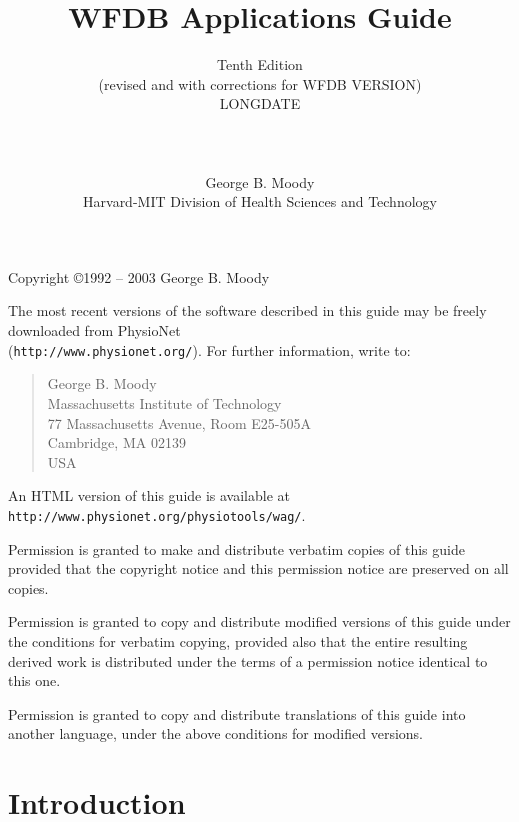 \documentclass[twoside]{book}
\title{WFDB Applications Guide}
\author{Tenth Edition\\
(revised and with corrections for WFDB VERSION)\\
LONGDATE\\
\\
\\
\\
George B. Moody\\
Harvard-MIT Division of Health Sciences and Technology}
\date{}
\begin{document}
\maketitle

\pagestyle{empty}
\vspace*{\fill}
\noindent
Copyright \copyright 1992 -- 2003 George B. Moody

\vspace{1 in}
\noindent
The most recent versions of the software described in this guide may be
freely downloaded from PhysioNet\\
({\tt http://www.physionet.org/}).
For further information, write to:

\begin{quote}
George B. Moody\\
Massachusetts Institute of Technology\\
77 Massachusetts Avenue, Room E25-505A\\
Cambridge, MA 02139\\
USA\\
\end{quote}

\noindent
An HTML version of this guide is available at
{\tt http://www.\-physio\-net.\-org/\-physio\-tools/\-wag/}.

\vspace{0.2 in}
\noindent
Permission is granted to make and distribute verbatim copies of this
guide provided that the copyright notice and this permission notice are
preserved on all copies.

\vspace{0.2 in}
\noindent
Permission is granted to copy and distribute modified versions of this
guide under the conditions for verbatim copying, provided also that the
entire resulting derived work is distributed under the terms of a
permission notice identical to this one.

\vspace{0.2 in}
\noindent
Permission is granted to copy and distribute translations of this guide
into another language, under the above conditions for modified versions.

\newpage
\pagestyle{fancyplain}

\tableofcontents

\newpage
{}


\chapter*{Introduction}
\end{document}
